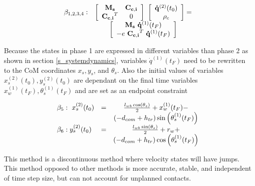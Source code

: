 \documentclass[default,iicol]{sn-jnl}
\theoremstyle{thmstyleone}%
\theoremstyle{thmstyletwo}%
\theoremstyle{thmstylethree}%
\begin{document}
\begin{equation}
\begin{array}{l c}
    \beta_{1,2,3,4}: & \left[\begin{array}{cc}
        \mathbf{M_s} & \mathbf{C_{c,i}} \\
        \mathbf{C_{c,i}}^T & 0
    \end{array} \right]\
    \left[\begin{array}{c}
       \mathbf{\dot q}^{(2)}(t_0)  \\
        \rho_c 
    \end{array}\right] =
     \\ &  
     \left[\begin{array}{c}
         \mathbf{M_s}\ \mathbf{\dot q}^{(1)}(t_F)   \\
         -e\ \mathbf{C_{c,i}}^T\ \mathbf{\dot q}^{(1)}(t_F)
    \end{array}\right]
    \end{array}
\end{equation}

Because the states in phase 1 are expressed in different variables than phase 2 as shown in section \ref{s_systemdynamics}, variables $\dot q^{(1)}(t_F)$ need to be rewritten to the CoM coordinates $x_s,y_s$, and $\theta_s$. Also the initial values of variables $x_s^{(2)}(t_0), y_s^{(2)}(t_0)$ are dependant on the final time variables $x_w^{(1)}(t_F), \theta_s^{(1)}(t_F)$ and are set as an endpoint constraint

\begin{equation}
\begin{array}{l c c}
\beta_5: \ x_s^{(2)}(t_0) & = & \frac{l_{w b} \cos \left(\theta_s\right)}{2}+x_w^{(1)}(t_F)- \\ 
& & \left(-d_{c o m}+h_{t r}\right) \sin \left(\theta_s^{(1)}(t_F)\right) \\

\beta_6: y_s^{(2)}(t_0) & = & \frac{l_{w b} \sin \left(\theta_s\right)}{2}+r_w+ \\ 
& & \left(-d_{c o m}+h_{t r}\right) \cos \left(\theta_s^{(1)}(t_F)\right)
\end{array}
\end{equation}

This method is a discontinuous method where velocity states will have jumps. This method opposed to other methods is more accurate, stable, and independent of time step size, but can not account for unplanned contacts\cite{ackermann_optimality_2010}. 
\end{document}
